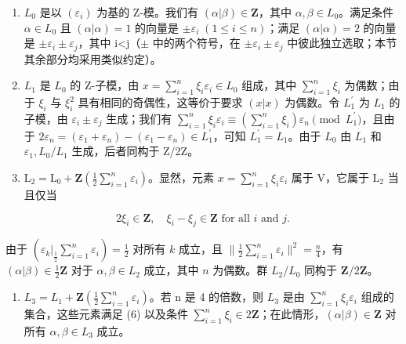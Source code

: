 \begin{enumerate}
\def\labelenumi{\arabic{enumi})}
\item
  \(L_{0}\) 是以 \((\varepsilon_{i})\) 为基的 Z-模。我们有 \((\alpha|\beta)\in\mathbf{Z}\)，其中 \(\alpha,\beta\in L_{0}\)。满足条件 \(\alpha\in L_{0}\) 且 \((\alpha|\alpha)=1\) 的向量是 \(\pm\varepsilon_{i}\;(1\leqslant i\leqslant n)\)；满足 \((\alpha|\alpha)=2\) 的向量是 \(\pm\varepsilon_{i}\pm\varepsilon_{j}\)，其中 i\textless j（\(\pm\) 中的两个符号，在 \(\pm\varepsilon_{i}\pm\varepsilon_{j}\) 中彼此独立选取；本节其余部分均采用类似约定）。
\item
  \(L_{1}\) 是 \(L_{0}\) 的 Z-子模，由 \(x = \sum_{i=1}^{n} \xi_{i} \varepsilon_{i} \in L_{0}\) 组成，其中 \(\sum_{i=1}^{n} \xi_{i}\) 为偶数；由于 \(\xi_{i}\) 与 \(\xi_{i}^{2}\) 具有相同的奇偶性，这等价于要求 \((x|x)\) 为偶数。令 \(L_{1}^{\prime}\) 为 \(L_{1}\) 的子模，由 \(\varepsilon_{i} \pm \varepsilon_{j}\) 生成；我们有 \(\sum_{i=1}^{n} \xi_{i} \varepsilon_{i} \equiv (\sum_{i=1}^{n} \xi_{i}) \varepsilon_{n} \pmod{L_{1}^{\prime}}\)，且由于 \(2\varepsilon_{n} = (\varepsilon_{1} + \varepsilon_{n}) - (\varepsilon_{1} - \varepsilon_{n}) \in L_{1}^{\prime}\)，可知 \(L_{1}^{\prime} = L_{1}\)。由于 \(L_{0}\) 由 \(L_{1}\) 和 \(\varepsilon_{1}, L_{0}/L_{1}\) 生成，后者同构于 Z/2Z。
\item
  \(\mathrm{L}_2 = \mathrm{L}_0 + \mathbf{Z}\left(\frac{1}{2} \sum_{i=1}^{n} \varepsilon_i\right)\)。显然，元素 \(x = \sum_{i=1}^{n} \xi_i \varepsilon_i\) 属于 \(\mathrm{V}\)，它属于 \(\mathrm{L}_2\) 当且仅当
\end{enumerate}

\[
2 \xi_ {i} \in \mathbf {Z}, \quad \xi_ {i} - \xi_ {j} \in \mathbf {Z} \text {   for   all   } i \text {   and   } j.\tag{6}
\]

由于 \((\varepsilon_k|_{\frac{1}{2}}\sum_{i=1}^{n}\varepsilon_i) = \frac{1}{2}\) 对所有 \(k\) 成立，且 \(\| \frac{1}{2}\sum_{i=1}^{n}\varepsilon_i\|^2 = \frac{n}{4}\)，有 \((\alpha|\beta) \in \frac{1}{2}\mathbf{Z}\) 对于 \(\alpha, \beta \in L_2\) 成立，其中 \(n\) 为偶数。群 \(L_2 / L_0\) 同构于 \(\mathbf{Z}/2\mathbf{Z}\)。

\begin{enumerate}
\def\labelenumi{\arabic{enumi})}
\setcounter{enumi}{3}
\tightlist
\item
  \(L_{3} = L_{1} + \mathbf{Z}\left(\frac{1}{2} \sum_{i=1}^{n} \varepsilon_{i}\right)\)。若 n 是 4 的倍数，则 \(L_{3}\) 是由 \(\sum_{i=1}^{n} \xi_{i} \varepsilon_{i}\) 组成的集合，这些元素满足 (6) 以及条件 \(\sum_{i=1}^{n} \xi_{i} \in 2\mathbf{Z}\)；在此情形，\((\alpha | \beta) \in \mathbf{Z}\) 对所有 \(\alpha, \beta \in L_{3}\) 成立。
\end{enumerate}

